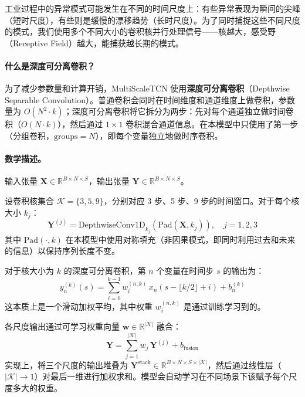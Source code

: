 \documentclass[UTF8]{ctexart}
\begin{document}
工业过程中的异常模式可能发生在不同的时间尺度上：有些异常表现为瞬间的尖峰（短时尺度），有些则是缓慢的漂移趋势（长时尺度）。为了同时捕捉这些不同尺度的模式，我们使用多个不同大小的卷积核并行处理信号——核越大，感受野（Receptive Field）越大，能捕获越长期的模式。

\paragraph{什么是深度可分离卷积？}

为了减少参数量和计算开销，MultiScaleTCN 使用\textbf{深度可分离卷积}（Depthwise Separable Convolution）。普通卷积会同时在时间维度和通道维度上做卷积，参数量为 $O(N^2 \cdot k)$；深度可分离卷积将它拆分为两步：先对每个通道独立做时间卷积（$O(N \cdot k)$），然后通过 $1 \times 1$ 卷积混合通道信息。在本模型中只使用了第一步（分组卷积，$\text{groups}=N$），即每个变量独立地做时序卷积。

\paragraph{数学描述。}

输入张量 $\mathbf{X} \in \mathbb{R}^{B \times N \times S}$，输出张量 $\mathbf{Y} \in \mathbb{R}^{B \times N \times S}$。

设卷积核集合 $\mathcal{K} = \{3, 5, 9\}$，分别对应 3 步、5 步、9 步的时间窗口。对于每个核大小 $k_j$：
\begin{equation}
    \mathbf{Y}^{(j)} = \mathrm{DepthwiseConv1D}_{k_j}\!\left(\mathrm{Pad}(\mathbf{X}, k_j)\right), \quad j = 1, 2, 3
\end{equation}
其中 $\mathrm{Pad}(\cdot, k)$ 在本模型中使用对称填充（非因果模式，即同时利用过去和未来的信息）以保持序列长度不变。

对于核大小为 $k$ 的深度可分离卷积，第 $n$ 个变量在时间步 $s$ 的输出为：
\begin{equation}
    y_n^{(k)}(s) = \sum_{i=0}^{k-1} w_i^{(n,k)} \, x_n(s - \lfloor k/2 \rfloor + i) + b_n^{(k)}
\end{equation}
这本质上是一个滑动加权平均，其中权重 $w_i^{(n,k)}$ 是通过训练学习到的。

各尺度输出通过可学习权重向量 $\mathbf{w} \in \mathbb{R}^{|\mathcal{K}|}$ 融合：
\begin{equation}
    \mathbf{Y} = \sum_{j=1}^{|\mathcal{K}|} w_j \, \mathbf{Y}^{(j)} + b_{\text{fusion}}
\end{equation}
实现上，将三个尺度的输出堆叠为 $\mathbf{Y}^{\text{stack}} \in \mathbb{R}^{B \times N \times S \times |\mathcal{K}|}$，然后通过线性层（$|\mathcal{K}| \to 1$）对最后一维进行加权求和。模型会自动学习在不同场景下该赋予每个尺度多大的权重。
\end{document}

